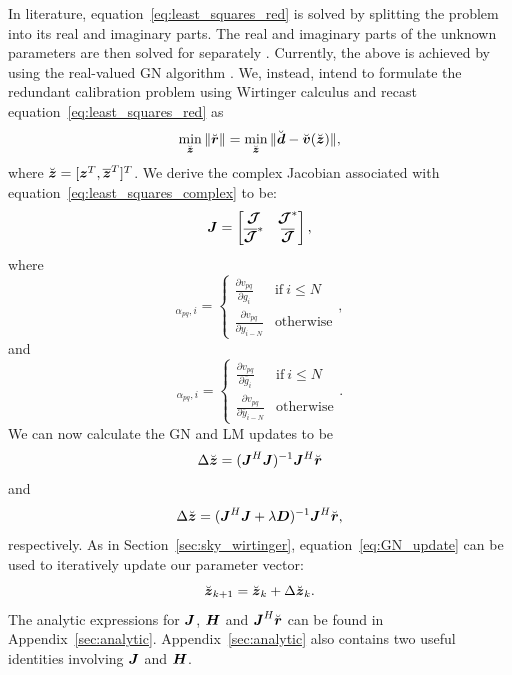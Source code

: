\documentclass[useAMS,usenatbib]{mn2e}
\newcommand{\bz}{\bmath{z}}
\newcommand{\br}{\bmath{r}}
\newcommand{\bd}{\bmath{d}}
\newcommand{\bv}{\bmath{v}}
\newcommand{\bJ}{\bmath{J}}
\newcommand{\bD}{\bmath{D}}
\newcommand{\bH}{\bmath{H}}
\newcommand{\bmJ}{\bmath{\mathcal{J}}}
\newcommand{\conj}[1]{\overline{#1}}
\begin{document}
In literature, equation~\ref{eq:least_squares_red} is solved by splitting the problem into its real and imaginary parts. The real and imaginary parts of the unknown parameters are then solved for separately \citep{Wieringa1992,Liu2010,Zheng2014}. 
Currently, the above is achieved by using the real-valued GN algorithm \citep{Kurien2016}. 
We, instead, intend to formulate the redundant calibration problem using Wirtinger calculus and recast equation~\ref{eq:least_squares_red} as
\begin{equation}
\label{eq:least_squares_complex}
\min_{\breve{\bz}} \|\breve{\br}\| = \min_{\breve{\bz}} \|\breve{\bd} - \breve{\bv}(\breve{\bz})\|, 
\end{equation}
where $\breve{\bz} = [\bz^T,\conj{\bz}^T]^T$. 
We derive the complex Jacobian associated with equation~\ref{eq:least_squares_complex} to be:
\begin{equation}
\label{eq:Jacobian}
\bJ = \begin{bmatrix}
       \bmJ & \bmJ^*\\
       \conj{\bmJ}^* & \conj{\bmJ} 
      \end{bmatrix},
\end{equation}
where 
\begin{equation}
[\bmJ]_{\alpha_{pq},i} = \begin{cases} 
     \frac{\partial v_{pq}}{\partial g_i} & \textrm{if}~i\leq N \\
     \frac{\partial v_{pq}}{\partial y_{i-N}} & \textrm{otherwise}  
\end{cases}, %
\end{equation}
and
\begin{equation}
[\bmJ^*]_{\alpha_{pq},i} = \begin{cases} 
     \frac{\partial v_{pq}}{\partial \conj{g}_i} & \textrm{if}~i\leq N \\
     \frac{\partial v_{pq}}{\partial \conj{y}_{i-N}} & \textrm{otherwise}  
\end{cases}. %
\end{equation}
We can now calculate the GN and LM updates to be 
\begin{equation}
\label{eq:GN_update}
\Delta \breve{\bz} = (\bJ^H\bJ)^{-1}\bJ^H\breve{\br}
\end{equation}
and 
\begin{equation}
\label{eq:LM_update}
\Delta \breve{\bz} = (\bJ^H\bJ + \lambda\bD)^{-1}\bJ^H\breve{\br},
\end{equation}
respectively. As in Section~\ref{sec:sky_wirtinger}, equation~\ref{eq:GN_update} can be used to iteratively update our parameter vector:
\begin{equation}
\label{eq:update}
\breve{\bz}_{k+1} = \breve{\bz}_{k} + \Delta \breve{\bz}_{k}. 
\end{equation}
The analytic expressions for $\bJ$, $\bH$ and $\bJ^H\breve{\br}$ can be found in Appendix~\ref{sec:analytic}.
Appendix~\ref{sec:analytic} also contains two useful identities involving $\bJ$ and $\bH$. 
\end{document}
